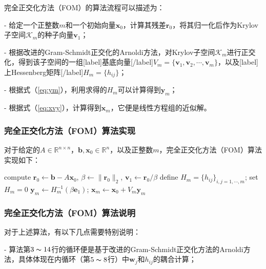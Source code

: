 \documentclass[UTF8,nofonts]{ctexart}
\begin{document}
完全正交化方法（FOM）的算法流程可以描述为：

- 给定一个正整数$m$和一个初始向量$\boldsymbol{x}_0$，计算其残差$\boldsymbol{r}_0$，将其归一化后作为Krylov子空间$\mathcal{K}_m$的种子向量$\boldsymbol{v}_1$；

- 根据改进的Gram-Schmidt正交化的Arnoldi方法，对Krylov子空间$\mathcal{K}_m$进行正交化，得到该子空间的一组[label]基底向量[/label]$V_m=\{\boldsymbol{v}_1,\boldsymbol{v}_2,\cdots,\boldsymbol{v}_m\}$，以及[label]上Hessenberg矩阵[/label]$H_m=\{h_{ij}\}$；

- 根据式（\ref{eq:ym}），利用求得的$H_m$可以计算得到$\boldsymbol{y}_m$；

- 根据式（\ref{eq:xvy}），计算得到$\boldsymbol{x}_m$，它便是线性方程组的近似解。

\subsubsection*{完全正交化方法（FOM）算法实现}

对于给定的$A\in\mathbb{R}^{n \times n}$，$\boldsymbol{b},\boldsymbol{x}_0\in\mathbb{R}^{n}$，以及正整数$m$，完全正交化方法（FOM）算法实现如下：

\begin{algorithm}[H]
compute $\boldsymbol{r}_0\gets\boldsymbol{b}-A\boldsymbol{x}_0$, $\beta\gets\|\boldsymbol{r}_0\|_2$, $\boldsymbol{v}_1\gets\boldsymbol{r}_0/\beta$\;
define $H_m=\{h_{ij}\}_{i,j=1,\cdots,m}$; set $H_m=0$\;
$\boldsymbol{y}_m\gets H_m^{-1}(\beta\boldsymbol{e}_1)$; $\boldsymbol{x}_m\gets\boldsymbol{x}_0+V_m\boldsymbol{y}_m$\;
\end{algorithm}

\subsubsection*{完全正交化方法（FOM）算法说明}

对于上述算法，有以下几点需要特别说明：

- 算法第$3\thicksim14$行的循环便是基于改进的Gram-Schmidt正交化方法的Arnoldi方法，具体体现在内循环（第$5\thicksim8$行）中$\boldsymbol{w}_j$和$h_{ij}$的耦合计算；
\end{document}
